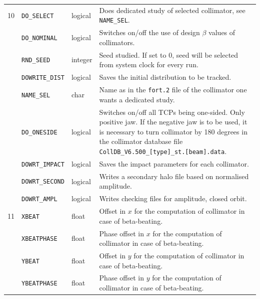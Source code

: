 \begin{center}
\begin{longtable}{| p{0.5cm} | p{2.4cm} | p{1.2cm} | >{\raggedright\arraybackslash}p{11.4cm}|}
    10  & \texttt{DO\_SELECT}    & logical & Does dedicated study of selected collimator, see \texttt{NAME\_SEL}. \\
        \cline{2-4}
        & \texttt{DO\_NOMINAL}   & logical & Switches on/off the use of design $\beta$ values of collimators. \\
        \cline{2-4}
        & \texttt{RND\_SEED}     & integer & Seed studied. If set to 0, seed will be selected from system clock for every run. \\
        \cline{2-4}
        & \texttt{DOWRITE\_DIST} & logical & Saves the initial distribution to be tracked. \\
        \cline{2-4}
        & \texttt{NAME\_SEL}     & char    & Name as in the \texttt{fort.2} file of the collimator one wants a dedicated study. \\
        \cline{2-4}
        & \texttt{DO\_ONESIDE}   & logical & Switches on/off all TCPs being one-sided. Only positive jaw. If the negative jaw is to be used, it is necessary to turn collimator by 180 degrees in the collimator database file \texttt{CollDB\_V6.500\_[type]\_st.[beam].data}. \\
        \cline{2-4}
        & \texttt{DOWRT\_IMPACT} & logical & Saves the impact parameters for each collimator. \\
        \cline{2-4}
        & \texttt{DOWRT\_SECOND} & logical & Writes a secondary halo file based on normalised amplitude. \\
        \cline{2-4}
        & \texttt{DOWRT\_AMPL}   & logical & Writes checking files for amplitude, closed orbit. \\
    \hline

    11  & \texttt{XBEAT}         & float   & Offset in $x$ for the computation of collimator in case of beta-beating\index{beta-beating}. \\
        \cline{2-4}
        & \texttt{XBEATPHASE}    & float   & Phase offset in $x$ for the computation of collimator in case of beta-beating\index{beta-beating}. \\
        \cline{2-4}
        & \texttt{YBEAT}         & float   & Offset in $y$ for the computation of collimator in case of beta-beating\index{beta-beating}. \\
        \cline{2-4}
        & \texttt{YBEATPHASE}    & float   & Phase offset in $y$ for the computation of collimator in case of beta-beating\index{beta-beating}. \\
    \hline


\end{longtable}
\end{center}

